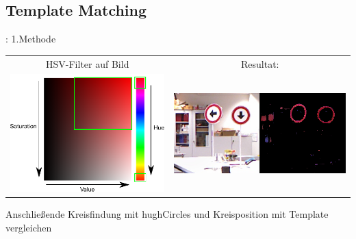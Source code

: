 \documentclass{VLKlauck}
\begin{document}
	\subsection{Template Matching}
	\begin{frame}{\insertsubsection: 1.Methode}
		\begin{tabular}{cc}
			HSV-Filter auf Bild 								   & Resultat:\\
			\includegraphics[scale=0.6]{HSV.pdf}  & \includegraphics[scale=0.7]{redFilterResult.png}\\	
		\end{tabular} 
		
		Anschließende Kreisfindung mit hughCircles und Kreisposition mit Template vergleichen
		
	\end{frame}
\end{document}
